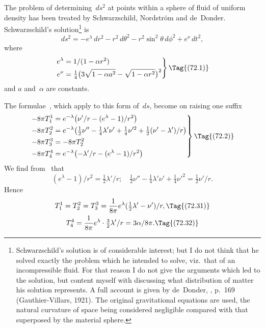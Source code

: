 \documentclass[12pt]{book}
\begin{document}
The problem of determining~$ds^{2}$ at points within a sphere of fluid of uniform
density has been treated by Schwarzschild, Nordström and de~Donder.
Schwarzschild's solution\footnote
  {Schwarzschild's solution is of considerable interest; but I do not think that he solved exactly
  the problem which he intended to solve, viz.\ that of an incompressible fluid. For that reason I do
  not give the arguments which led to the solution, but content myself with discussing what distribution
  of matter his solution represents. A full account is given by de~Donder, , p.~169 (Gauthier-Villars, 1921). The original gravitational equations are used, the
  natural curvature of space being considered negligible compared with that superposed by the
  material sphere.}
is
\[
ds^{2} = -e^{\lambda}\, dr^{2} - r^{2}\, d\theta^{2} - r^{2}\sin^{2}\theta\, d\phi^{2} + e^{\nu}\, dt^{2},
\]
where
\[
\left.
\begin{aligned}
  e^{\lambda} &= 1/(1 - \alpha r^{2}) \\
  e^{\nu} &= \tfrac{1}{4}\bigl(3\sqrt{1 - \alpha a^{2}} - \sqrt{1 - \alpha r^{2}}\bigr)^{2}
\end{aligned}
\right\}
\Tag{(72.1)}
\]
and $a$ and~$\alpha$ are constants.

The formulae~, which apply to this form of~$ds$, become on raising one
suffix
\[
\left.
\begin{aligned}
  -8\pi T_{1}^{1} &= e^{-\lambda} \bigl(\nu'/r - (e^{\lambda} - 1)/r^{2}\bigr)\\
  -8\pi T_{2}^{2} &= e^{-\lambda} \bigl(\tfrac{1}{2} \nu'' - \tfrac{1}{4}\lambda'\nu' + \tfrac{1}{4}\nu'^{2} + \tfrac{1}{2}(\nu' - \lambda')/r\bigr)\\
  -8\pi T_{3}^{3} &= -8\pi T_{2}^{2}\\
  -8\pi T_{4}^{4} &= e^{-\lambda} \bigl(-\lambda'/r - (e^{\lambda} - 1)/r^{2}\bigr)
\end{aligned}
\right\}
\Tag{(72.2)}
\]
We find from~ that
\[
(e^{\lambda} - 1)/r^{2} = \tfrac{1}{2}\lambda'/r;\quad
\tfrac{1}{2} \nu'' - \tfrac{1}{4}\lambda'\nu' + \tfrac{1}{4}\nu'^{2}  = \tfrac{1}{2}\nu'/r.
\]
Hence
\begin{gather*}
  T_{1}^{1} = T_{2}^{2} = T_{3}^{3} = \frac{1}{8\pi} e^{\lambda}(\tfrac{1}{2}\lambda' - \nu')/r,
\Tag{(72.31)} \\
T_{4}^{4} = \frac{1}{8\pi} e^{\lambda} \cdot \tfrac{3}{2}\lambda'/r
= 3\alpha/8\pi.
\Tag{(72.32)}
\end{gather*}
\end{document}
